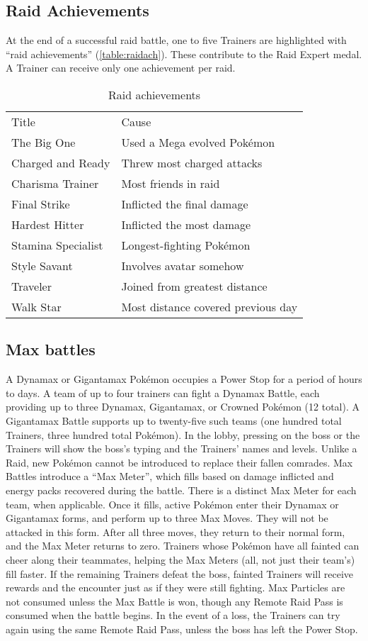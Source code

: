 \subsection{Raid Achievements\label{subsec:raidachievements}}
At the end of a successful raid battle, one to five Trainers
 are highlighted with ``raid achievements'' (\autoref{table:raidach}).
These contribute to the Raid Expert medal.
A Trainer can receive only one achievement per raid.
\begin{table}
\centering
\begin{tabular}{ll}
Title & Cause\\
\Midrule
The Big One & Used a Mega evolved Pokémon\\
Charged and Ready & Threw most charged attacks\\
Charisma Trainer & Most friends in raid\\
Final Strike & Inflicted the final damage\\
Hardest Hitter & Inflicted the most damage\\
Stamina Specialist & Longest-fighting Pokémon\\
Style Savant & Involves avatar somehow\\
Traveler & Joined from greatest distance\\
Walk Star & Most distance covered previous day\\
\end{tabular}
\caption{Raid achievements\label{table:raidach}}
\end{table}

\subsection{Max battles\label{sec:maxbattles}}
A Dynamax or Gigantamax Pokémon occupies a Power Stop for a period of hours to days.
A team of up to four trainers can fight a Dynamax Battle, each providing up to
  three Dynamax, Gigantamax, or Crowned Pokémon (12 total).
A Gigantamax Battle supports up to twenty-five such teams (one hundred total Trainers, three hundred total Pokémon).
In the lobby, pressing on the boss or the Trainers will show the boss's typing and the Trainers'
 names and levels.
Unlike a Raid, new Pokémon cannot be introduced to replace their fallen comrades.
Max Battles introduce a ``Max Meter'', which fills based on damage inflicted and
  energy packs recovered during the battle.
There is a distinct Max Meter for each team, when applicable.
Once it fills, active Pokémon enter their Dynamax or Gigantamax forms, and perform
  up to three Max Moves.
They will not be attacked in this form.
After all three moves, they return to their normal form, and the Max Meter returns to zero.
Trainers whose Pokémon have all fainted can cheer along their teammates,
  helping the Max Meters (all, not just their team's) fill faster.
If the remaining Trainers defeat the boss, fainted Trainers will
 receive rewards and the encounter just as if they were still fighting.
Max Particles are not consumed unless the Max Battle is won, though any Remote Raid Pass
 is consumed when the battle begins.
In the event of a loss, the Trainers can try again using the same Remote Raid Pass,
 unless the boss has left the Power Stop.

